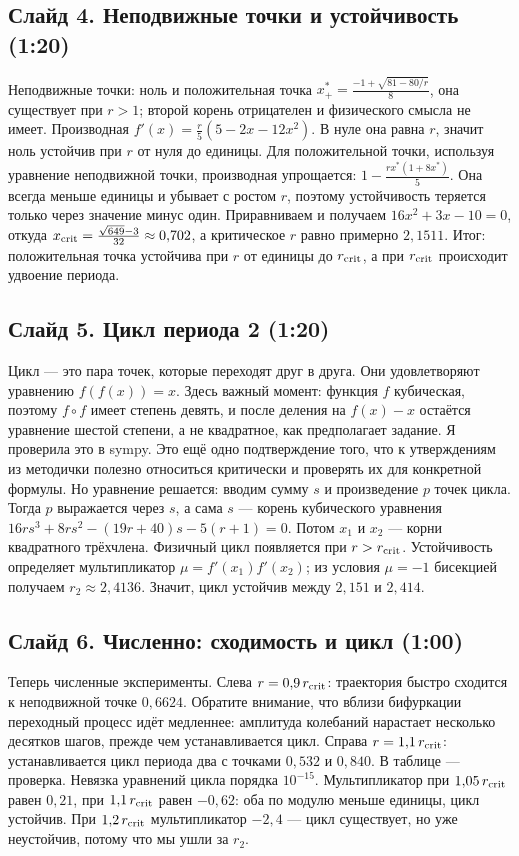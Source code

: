 \documentclass[12pt,a4paper]{article}
\begin{document}
\subsection*{Слайд 4. Неподвижные точки и устойчивость (1:20)}
Неподвижные точки: ноль и положительная точка $x^*_+=\frac{-1+\sqrt{81-80/r}}{8}$, она существует при $r>1$; второй корень отрицателен и физического смысла не имеет. Производная $f'(x)=\frac r5(5-2x-12x^2)$. В нуле она равна $r$, значит ноль устойчив при $r$ от нуля до единицы. Для положительной точки, используя уравнение неподвижной точки, производная упрощается: $1-\frac{r x^*(1+8x^*)}{5}$. Она всегда меньше единицы и убывает с ростом $r$, поэтому устойчивость теряется только через значение минус один. Приравниваем и получаем $16x^2+3x-10=0$, откуда $x_{\rm crit}=\frac{\sqrt{649}-3}{32}\approx0{,}702$, а критическое $r$ равно примерно $2{,}1511$. Итог: положительная точка устойчива при $r$ от единицы до $r_{\rm crit}$, а при $r_{\rm crit}$ происходит удвоение периода.

\subsection*{Слайд 5. Цикл периода 2 (1:20)}
Цикл --- это пара точек, которые переходят друг в друга. Они удовлетворяют уравнению $f(f(x))=x$. Здесь важный момент: функция $f$ кубическая, поэтому $f\circ f$ имеет степень девять, и после деления на $f(x)-x$ остаётся уравнение шестой степени, а не квадратное, как предполагает задание. Я проверила это в sympy. Это ещё одно подтверждение того, что к утверждениям из методички полезно относиться критически и проверять их для конкретной формулы. Но уравнение решается: вводим сумму $s$ и произведение $p$ точек цикла. Тогда $p$ выражается через $s$, а сама $s$ --- корень кубического уравнения $16rs^3+8rs^2-(19r+40)s-5(r+1)=0$. Потом $x_1$ и $x_2$ --- корни квадратного трёхчлена. Физичный цикл появляется при $r>r_{\rm crit}$. Устойчивость определяет мультипликатор $\mu=f'(x_1)f'(x_2)$; из условия $\mu=-1$ бисекцией получаем $r_2\approx2{,}4136$. Значит, цикл устойчив между $2{,}151$ и $2{,}414$.

\subsection*{Слайд 6. Численно: сходимость и цикл (1:00)}
Теперь численные эксперименты. Слева $r=0{,}9\,r_{\rm crit}$: траектория быстро сходится к неподвижной точке $0{,}6624$. Обратите внимание, что вблизи бифуркации переходный процесс идёт медленнее: амплитуда колебаний нарастает несколько десятков шагов, прежде чем устанавливается цикл. Справа $r=1{,}1\,r_{\rm crit}$: устанавливается цикл периода два с точками $0{,}532$ и $0{,}840$. В таблице --- проверка. Невязка уравнений цикла порядка $10^{-15}$. Мультипликатор при $1{,}05\,r_{\rm crit}$ равен $0{,}21$, при $1{,}1\,r_{\rm crit}$ равен $-0{,}62$: оба по модулю меньше единицы, цикл устойчив. При $1{,}2\,r_{\rm crit}$ мультипликатор $-2{,}4$ --- цикл существует, но уже неустойчив, потому что мы ушли за $r_2$.
\end{document}
